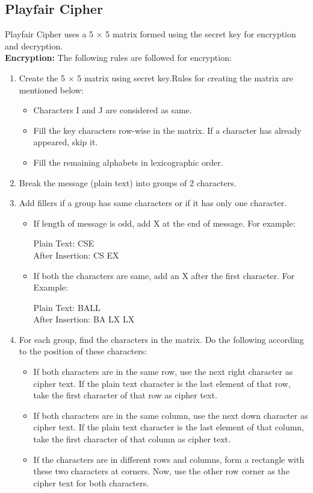 \documentclass[11pt]{article}
\begin{document}
\subsection{Playfair Cipher}
Playfair Cipher uses a 5 $\times$ 5 matrix formed using the secret key for encryption and decryption.\\
\newline
\textbf{Encryption:} The following rules are followed for encryption:
\begin{enumerate}
    \item Create the 5 $\times$ 5 matrix using secret key.Rules for creating the matrix are mentioned below:
    \begin{itemize}
        \item Characters I and J are considered as same.
        \item Fill the key characters row-wise in the matrix. If a character has already appeared, skip it.
        \item Fill the remaining alphabets in lexicographic order.
    \end{itemize}
    \item Break the message (plain text) into groups of 2 characters.
    \item Add fillers if a group has same characters or if it has only one character.
    \begin{itemize}
        \item If length of message is odd, add X at the end of message. For example:
        \begin{center}
            Plain Text: CSE\\
            After Insertion: CS EX
        \end{center}
        \item If both the characters are same, add an X after the first character. For Example:
        \begin{center}
            Plain Text: BALL\\
            After Insertion: BA LX LX
        \end{center}
    \end{itemize}
    \item For each group, find the characters in the matrix. Do the following according to the position of these characters:
    \begin{itemize}
        \item If both characters are in the same row, use the next right character as cipher text. If the plain text character is the last element of that row,  take the first character of that row as cipher text.
        \item If both characters are in the same column, use the next down character as cipher text. If the plain text character is the last element of that column, take the first character of that column as cipher text.
        \item If the characters are in different rows and columns, form a rectangle with these two characters at corners. Now, use the other row corner as the cipher text for both characters.
    \end{itemize}
\end{enumerate}
\end{document}
